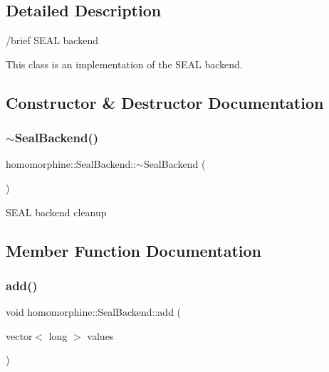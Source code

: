\subsection{Detailed Description}
/brief S\+E\+AL backend

This class is an implementation of the S\+E\+AL backend. 

\subsection{Constructor \& Destructor Documentation}
\mbox{\label{classhomomorphine_1_1_seal_backend_a7224092a19a3472a5143d16b80fb9775}} 
\subsubsection{\texorpdfstring{$\sim$SealBackend()}{~SealBackend()}}
{\footnotesize\ttfamily homomorphine\+::\+Seal\+Backend\+::$\sim$\+Seal\+Backend (\begin{DoxyParamCaption}{ }\end{DoxyParamCaption})}

S\+E\+AL backend cleanup 

\subsection{Member Function Documentation}
\mbox{\label{classhomomorphine_1_1_seal_backend_ae868a22dda1eed2246c59aa831707bf1}} 
\subsubsection{\texorpdfstring{add()}{add()}\hspace{0.1cm}{\footnotesize\ttfamily [1/2]}}
{\footnotesize\ttfamily void homomorphine\+::\+Seal\+Backend\+::add (\begin{DoxyParamCaption}\item[{vector$<$ long $>$}]{values }\end{DoxyParamCaption})\hspace{0.3cm}{\ttfamily [virtual]}}

